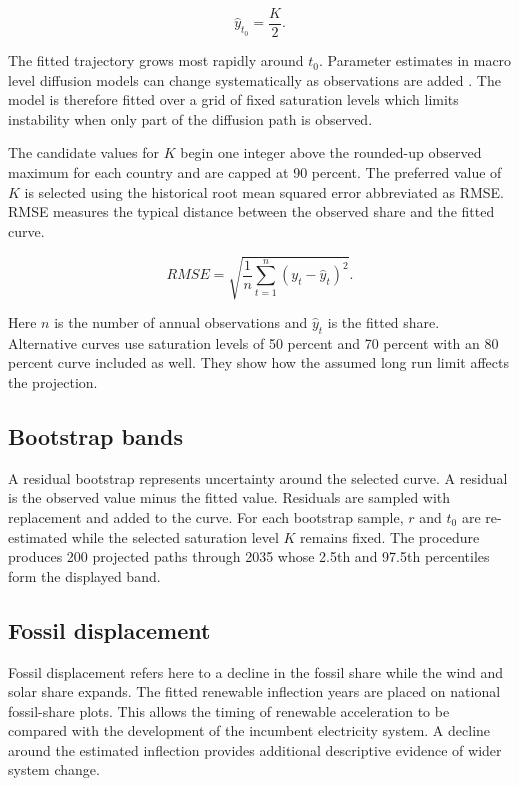 \documentclass[
]{krantz}
\begin{document}
\[
\hat{y}_{t_0}=\frac{K}{2}.
\]

The fitted trajectory grows most rapidly around \(t_0\). Parameter estimates in macro level diffusion models can change systematically as observations are added \citep{vandenbulte1997}. The model is therefore fitted over a grid of fixed saturation levels which limits instability when only part of the diffusion path is observed.

The candidate values for \(K\) begin one integer above the rounded-up observed maximum for each country and are capped at 90 percent. The preferred value of \(K\) is selected using the historical root mean squared error abbreviated as RMSE. RMSE measures the typical distance between the observed share and the fitted curve.

\[
RMSE =
\sqrt{
\frac{1}{n}
\sum_{t=1}^{n}
(y_t-\hat{y}_t)^2
}.
\]

Here \(n\) is the number of annual observations and \(\hat{y}_t\) is the fitted share. Alternative curves use saturation levels of 50 percent and 70 percent with an 80 percent curve included as well. They show how the assumed long run limit affects the projection.

\subsection*{Bootstrap bands}\label{bootstrap-bands}


A residual bootstrap represents uncertainty around the selected curve. A residual is the observed value minus the fitted value. Residuals are sampled with replacement and added to the curve. For each bootstrap sample, \(r\) and \(t_0\) are re-estimated while the selected saturation level \(K\) remains fixed. The procedure produces 200 projected paths through 2035 whose 2.5th and 97.5th percentiles form the displayed band.

\subsection*{Fossil displacement}\label{fossil-displacement}


Fossil displacement refers here to a decline in the fossil share while the wind and solar share expands. The fitted renewable inflection years are placed on national fossil-share plots. This allows the timing of renewable acceleration to be compared with the development of the incumbent electricity system. A decline around the estimated inflection provides additional descriptive evidence of wider system change.
\end{document}
